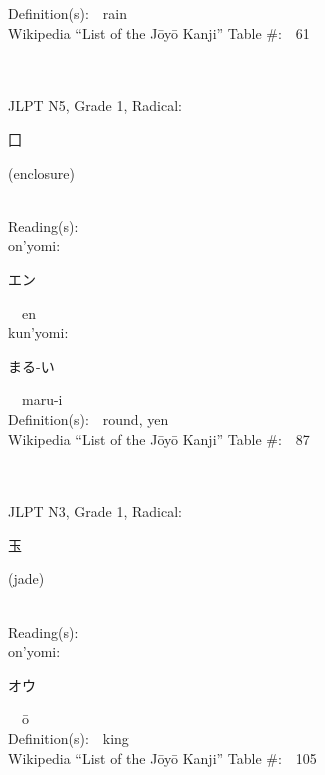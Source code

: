 \begin{multicols}{2}
Definition(s):\ \ rain \\
Wikipedia ``List of the J\=oy\=o Kanji'' Table \#:\ \ 61 \\
\ \ \\
{\fontsize{34pt}{40pt}  }\ \ \\  %
{JLPT N5, Grade 1, Radical:\ \ {\begin{CJK}{UTF8}{min} 囗 \end{CJK}} (enclosure) } \\
Reading(s):\ \ \\
{\hspace*{1em}}on'yomi:\ \ \\
{\hspace*{2em}}{\begin{CJK}{UTF8}{min} エン \end{CJK}}\ \ en\ \ \\
{\hspace*{1em}}kun'yomi:\ \ \\
{\hspace*{2em}}{\begin{CJK}{UTF8}{min} まる-い \end{CJK}}\ \ maru-i\ \ \\
Definition(s):\ \ round, yen \\
Wikipedia ``List of the J\=oy\=o Kanji'' Table \#:\ \ 87 \\
\ \ \\
{\fontsize{34pt}{40pt}  }\ \ \\  %
{JLPT N3, Grade 1, Radical:\ \ {\begin{CJK}{UTF8}{min} 玉 \end{CJK}} (jade) } \\
Reading(s):\ \ \\
{\hspace*{1em}}on'yomi:\ \ \\
{\hspace*{2em}}{\begin{CJK}{UTF8}{min} オウ \end{CJK}}\ \ \=o\ \ \\
Definition(s):\ \ king \\
Wikipedia ``List of the J\=oy\=o Kanji'' Table \#:\ \ 105 \\

\end{multicols}
